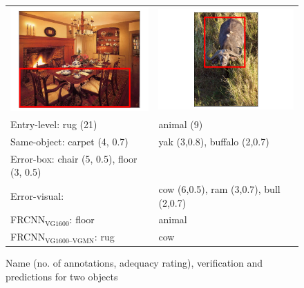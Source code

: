 \begin{figure}
	\centering
	\footnotesize
	\begin{tabular}{p{3.7cm}p{3.7cm}}
		\includegraphics[scale=.2]{images/556_1063956_seed_ambiguous.png} &
		\includegraphics[scale=.2]{images/2657_1069343_singleton_obj.png} 
		\\
		Entry-level: rug (21) &  animal (9)\\
		\midrule
		Same-object: carpet (4, 0.7) &  yak (3,0.8), buffalo (2,0.7) \\
		Error-box: chair (5, 0.5), floor (3, 0.5) & \\
		Error-visual:  & cow (6,0.5), ram (3,0.7), bull (2,0.7)\\
		\midrule
		FRCNN$_{\text{VG1600}}$: floor & animal\\
		FRCNN$_{\text{VG1600--VGMN}}$: rug & cow \\
	\end{tabular}
	\caption{Name (no. of annotations, adequacy rating), verification and predictions for two objects}
	\label{fig:mistakes}
\end{figure}

